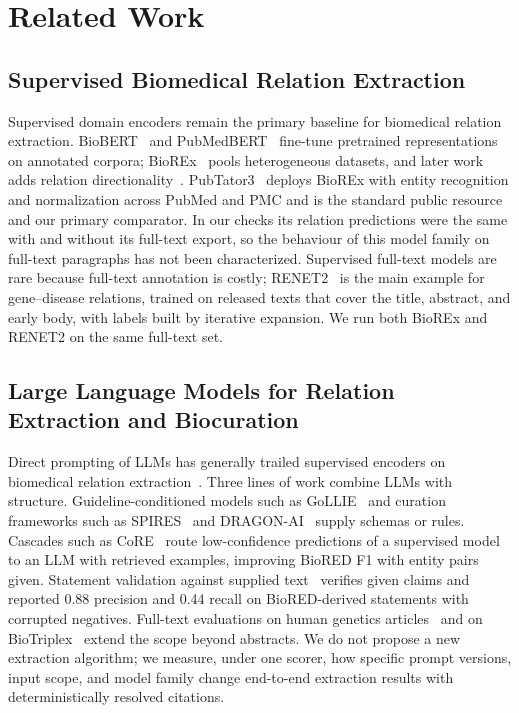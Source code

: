 \documentclass[preprint,10pt,letterpaper]{elsarticle}
\begin{document}
\section{Related Work}

\subsection{Supervised Biomedical Relation Extraction}
Supervised domain encoders remain the primary baseline for biomedical relation extraction. BioBERT~\cite{lee2020biobert} and PubMedBERT~\cite{gu2021pubmedbert} fine-tune pretrained representations on annotated corpora; BioREx~\cite{lai2023biorex} pools heterogeneous datasets, and later work adds relation directionality~\cite{lai2025directionality}. PubTator3~\cite{wei2024pubtator3} deploys BioREx with entity recognition and normalization across PubMed and PMC and is the standard public resource and our primary comparator. In our checks its relation predictions were the same with and without its full-text export, so the behaviour of this model family on full-text paragraphs has not been characterized. Supervised full-text models are rare because full-text annotation is costly; RENET2~\cite{su2021renet2} is the main example for gene--disease relations, trained on released texts that cover the title, abstract, and early body, with labels built by iterative expansion. We run both BioREx and RENET2 on the same full-text set.

\subsection{Large Language Models for Relation Extraction and Biocuration}
Direct prompting of LLMs has generally trailed supervised encoders on biomedical relation extraction~\cite{chen2025benchmarking,islamaj2024biocreative,brokman2025benchmark,gade2025benchmarking}. Three lines of work combine LLMs with structure. Guideline-conditioned models such as GoLLIE~\cite{sainz2024gollie} and curation frameworks such as SPIRES~\cite{caufield2024spires} and DRAGON-AI~\cite{toro2024dragonai} supply schemas or rules. Cascades such as CoRE~\cite{song2026core} route low-confidence predictions of a supervised model to an LLM with retrieved examples, improving BioRED F1 with entity pairs given. Statement validation against supplied text~\cite{adam2025traceable} verifies given claims and reported 0.88 precision and 0.44 recall on BioRED-derived statements with corrupted negatives. Full-text evaluations on human genetics articles~\cite{yin2026benchmarking} and on BioTriplex~\cite{collins2026biotriplex} extend the scope beyond abstracts. We do not propose a new extraction algorithm; we measure, under one scorer, how specific prompt versions, input scope, and model family change end-to-end extraction results with deterministically resolved citations.
\end{document}
